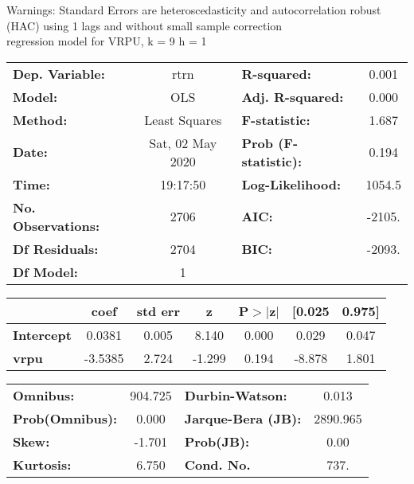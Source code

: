 Warnings: \newline
 [1] Standard Errors are heteroscedasticity and autocorrelation robust (HAC) using 1 lags and without small sample correction\\ 

regression model for VRPU, k = 9 h = 1\begin{center}
\begin{tabular}{lclc}
\toprule
\textbf{Dep. Variable:}    &       rtrn       & \textbf{  R-squared:         } &     0.001   \\
\textbf{Model:}            &       OLS        & \textbf{  Adj. R-squared:    } &     0.000   \\
\textbf{Method:}           &  Least Squares   & \textbf{  F-statistic:       } &     1.687   \\
\textbf{Date:}             & Sat, 02 May 2020 & \textbf{  Prob (F-statistic):} &    0.194    \\
\textbf{Time:}             &     19:17:50     & \textbf{  Log-Likelihood:    } &    1054.5   \\
\textbf{No. Observations:} &        2706      & \textbf{  AIC:               } &    -2105.   \\
\textbf{Df Residuals:}     &        2704      & \textbf{  BIC:               } &    -2093.   \\
\textbf{Df Model:}         &           1      & \textbf{                     } &             \\
\bottomrule
\end{tabular}
\begin{tabular}{lcccccc}
                   & \textbf{coef} & \textbf{std err} & \textbf{z} & \textbf{P$> |$z$|$} & \textbf{[0.025} & \textbf{0.975]}  \\
\midrule
\textbf{Intercept} &       0.0381  &        0.005     &     8.140  &         0.000        &        0.029    &        0.047     \\
\textbf{vrpu}      &      -3.5385  &        2.724     &    -1.299  &         0.194        &       -8.878    &        1.801     \\
\bottomrule
\end{tabular}
\begin{tabular}{lclc}
\textbf{Omnibus:}       & 904.725 & \textbf{  Durbin-Watson:     } &    0.013  \\
\textbf{Prob(Omnibus):} &   0.000 & \textbf{  Jarque-Bera (JB):  } & 2890.965  \\
\textbf{Skew:}          &  -1.701 & \textbf{  Prob(JB):          } &     0.00  \\
\textbf{Kurtosis:}      &   6.750 & \textbf{  Cond. No.          } &     737.  \\
\bottomrule
\end{tabular}
\end{center}

